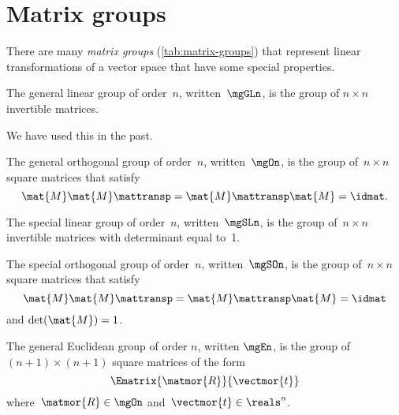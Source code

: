
\section{Matrix groups}



There are many \emph{matrix groups} (\cref{tab:matrix-groups}) that represent linear transformations of a vector space that have some special properties.

\begin{definition}\label{def:general-linear-group}
The general linear group of order~$n$, written~$\mgGLn$, is the group of $n\times n$ invertible matrices.
\end{definition}

We have used this in the past.

\begin{definition}\label{def:general-orthogonal-group}
The general orthogonal group of order~$n$, written~$\mgOn$, is the group of~$n\times n$ square matrices that satisfy
\begin{equation}
\mat{M} \mat{M}\mattransp = \mat{M}\mattransp \mat{M} = \idmat.
\end{equation}
\end{definition}


\begin{definition}\label{def:special-linear-group}
  The special linear group of order~$n$, written~$\mgSLn$, is the group of~$n\times n$ invertible matrices with determinant equal to~1.
  \end{definition}
\begin{definition}\label{def:special-orthogonal-group}
  The special orthogonal group of order~$n$, written~$\mgSOn$, is the group of~$n\times n$ square matrices that satisfy
  \begin{equation}
  \mat{M} \mat{M}\mattransp = \mat{M}\mattransp \mat{M} = \idmat
  \end{equation}
  and $\det(\mat{M}) = 1$.
  \end{definition}

\begin{definition}\label{def:general-euclidean-group}
The general Euclidean group of order $n$, written $\mgEn$, is the group of $(n+1)\times (n+1)$ square matrices of the form
\begin{equation}\label{eq:En-def}
\Ematrix{\matmor{R}}{\vectmor{t}}
\end{equation}
where~$\matmor{R}\in \mgOn$ and~$\vectmor{t} \in \reals^n$.
\end{definition}



